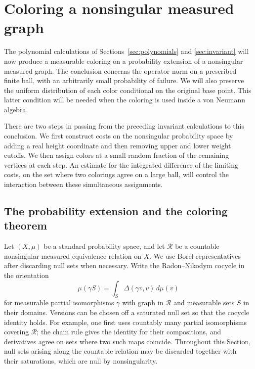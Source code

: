 \section{Coloring a nonsingular measured graph}
\label{sec:coloring}

The polynomial calculations of Sections~\ref{sec:polynomials} and
\ref{sec:invariant} will now produce a measurable coloring on a probability
extension of a nonsingular measured graph.  The conclusion concerns the
operator norm on a prescribed finite ball, with an arbitrarily small
probability of failure.  We will also preserve the uniform distribution of
each color conditional on the original base point.  This latter condition
will be needed when the coloring is used inside a von Neumann algebra.

There are two steps in passing from the preceding invariant calculations to
this conclusion.  We first construct costs on the nonsingular probability
space by adding a real height coordinate and then removing upper and lower
weight cutoffs.  We then assign colors at a small random fraction of the
remaining vertices at each step.  An estimate for the integrated difference
of the limiting costs, on the set where two colorings agree on a large ball,
will control the interaction between these simultaneous assignments.

\subsection{The probability extension and the coloring theorem}

Let $(X,\mu)$ be a standard probability space, and let $\mathcal R$ be a
countable nonsingular measured equivalence relation on $X$.  We use Borel
representatives after discarding null sets when necessary.  Write the
Radon--Nikodym cocycle in the orientation
\begin{equation}
 \mu(\gamma S)
   =\int_S\Delta(\gamma v,v)\,d\mu(v)
 \label{eq:coloring-cocycle}
\end{equation}
for measurable partial isomorphisms $\gamma$ with graph in $\mathcal R$ and
measurable sets $S$ in their domains.  Versions can be chosen off a saturated
null set so that the cocycle identity holds.  For example, one first uses
countably many partial isomorphisms covering $\mathcal R$; the chain rule
gives the identity for their compositions, and derivatives agree on sets
where two such maps coincide.  Throughout this Section, null sets arising
along the countable relation may be discarded together with their
saturations, which are null by nonsingularity.

